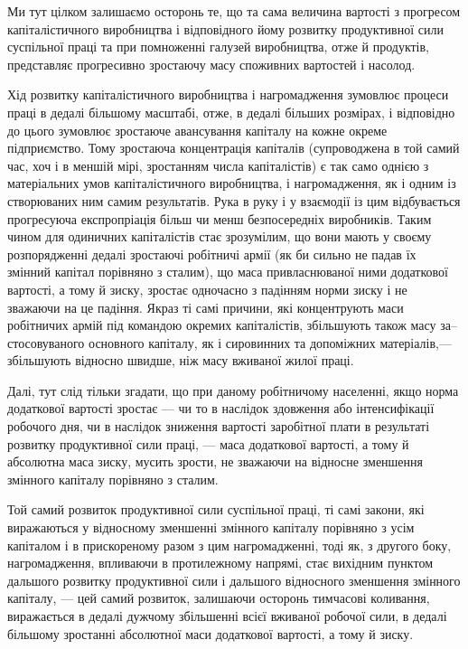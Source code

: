 \documentclass[12pt, a4paper, final]{memoir}
\begin{document}
Ми тут цілком залишаємо осторонь те, що та сама величина вартості з прогресом капіталістичного виробництва і відповідного йому розвитку продуктивної сили суспільної праці та при помноженні галузей виробництва, отже й продуктів, представляє прогресивно зростаючу масу споживних вартостей і насолод.

Хід розвитку капіталістичного виробництва і нагромадження зумовлює процеси праці в дедалі більшому масштабі, отже, в дедалі більших розмірах, і відповідно до цього зумовлює зростаюче авансування капіталу на кожне окреме підприємство. Тому зростаюча концентрація капіталів (супроводжена в той самий час, хоч і в меншій мірі, зростанням числа капіталістів) є так само однією з матеріальних умов капіталістичного виробництва, і нагромадження, як і одним із створюваних ним самим результатів. Рука в руку і у взаємодії із цим відбувається прогресуюча експропріація більш чи менш безпосередніх виробників. Таким чином для одиничних капіталістів стає зрозумілим, що вони мають у своєму розпорядженні дедалі зростаючі робітничі армії (як би сильно не падав їх змінний капітал порівняно з сталим), що маса привласнюваної ними додаткової вартості, а тому й зиску, зростає одночасно з падінням норми зиску і не зважаючи на це падіння. Якраз ті самі причини, які концентрують маси робітничих армій під командою окремих капіталістів, збільшують також масу за--стосовуваного основного капіталу, як і сировинних та допоміжних матеріалів,— збільшують відносно швидше, ніж масу вживаної жилої праці.

Далі, тут слід тільки згадати, що при даному робітничому населенні, якщо норма додаткової вартості зростає — чи то в наслідок здовження або інтенсифікації робочого дня, чи в наслідок зниження вартості заробітної плати в результаті розвитку продуктивної сили праці, — маса додаткової вартості, а тому й абсолютна маса зиску, мусить зрости, не зважаючи на відносне зменшення змінного капіталу порівняно з сталим.

Той самий розвиток продуктивної сили суспільної праці, ті самі закони, які виражаються у відносному зменшенні змінного капіталу порівняно з усім капіталом і в прискореному разом з цим нагромадженні, тоді як, з другого боку, нагромадження, впливаючи в протилежному напрямі, стає вихідним пунктом дальшого розвитку продуктивної сили і дальшого відносного зменшення змінного капіталу, — цей самий розвиток, залишаючи осторонь тимчасові коливання, виражається в дедалі дужчому збільшенні всієї вживаної робочої сили, в дедалі більшому зростанні абсолютної маси додаткової вартості, а тому й зиску.
\end{document}

